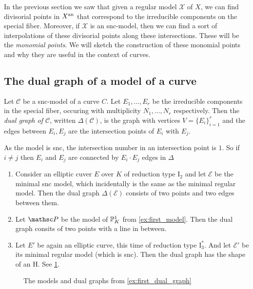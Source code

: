 In the previous section we saw that given a regular model $\mathscr X$ of $X$, we can find divisorial points in $X{}^{\text{an}}$ that correspond to the irreducible components on the special fiber.  
Moreover, if $\mathscr X$ is an snc-model, then we can find a sort of interpolations of these divisorial points along these intersections. 
These will be the \emph{monomial points}. 
We will sketch the construction of these monomial points and why they are useful in the context of curves. 

\subsection{The dual graph of a model of a curve} \label{sec:the_dual_graph_of_a_model_of_a_curve}
\begin{definition}
	Let $\mathscr C$ be a snc-model of a curve $C$.
	Let $E_1, \ldots, E_r$ be the irreducible components in the special fiber, occuring with multiplicity $N_1, \ldots, N_r$ respectively. 
	Then the \emph{dual graph of $\mathscr C$}, written $\Delta(\mathscr C)$, is the graph with vertices $V = \{E_i\}_{i = 1}^{r} $ and the edges between $E_i, E_j$ are the intersection points of $E_i$ with $E_j$. 
\end{definition}
As the model is snc, the intersection number in an intersection point is  $1$. 
So if $i \ne j$ then $E_i$ and $E_j$ are connected by $E_i \cdot E_j$ edges in $\Delta$
\begin{example}\label{ex:first_dual_graph}
	\begin{enumerate}
		\item Consider an elliptic cuver $E$ over $K$ of reduction type $\mathrm I_2$ and let $\mathscr E$ be the minimal snc model, which incidentally is the same as the minimal regular model. 
			Then the dual graph $\Delta(\mathscr E)$ consists of two points and two edges between them.
		\item Let $\mathsc P$ be the model of $\mathbb{P}_K^{1}$ from \cref{ex:first_model}. 
			Then the dual graph consits of two points with a line in between. 
		\item Let $E'$ be again an elliptic curve, this time of reduction type $\mathrm I_3^*$. 
			And let $\mathscr E'$ be its minimal regular model (which is snc). 
			Then the dual graph has the shape of an H. See \cref{fig:example_dual_graph}.

	\end{enumerate}
\end{example}

\begin{figure}[h]
    \centering
    \caption{The models and dual graphs from \cref{ex:first_dual_graph}}
    \label{fig:example_dual_graph}
\end{figure}

